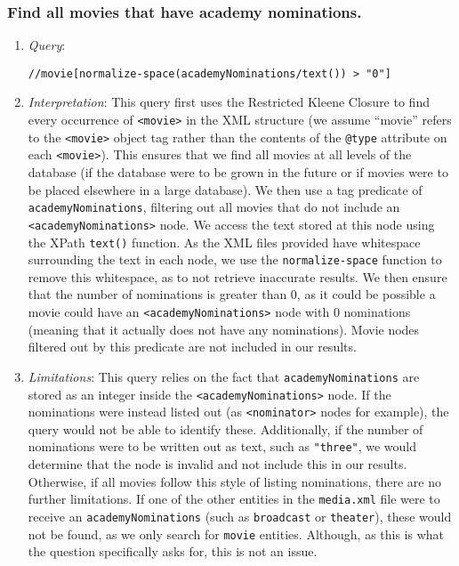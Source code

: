 \documentclass[11pt]{article}
\begin{document}
\subsubsection{Find all movies that have academy nominations.}

\begin{enumerate}
\item \textit{Query}:
\begin{small}
\begin{verbatim}
//movie[normalize-space(academyNominations/text()) > "0"]
\end{verbatim}
\end{small}
\item \textit{Interpretation}: This query first uses the Restricted Kleene Closure to find every occurrence of \texttt{<movie>} in the XML structure (we assume ``movie'' refers to the \texttt{<movie>} object tag rather than the contents of the \texttt{@type} attribute on each \texttt{<movie>}). This ensures that we find all movies at all levels of the database (if the database were to be grown in the future or if movies were to be placed elsewhere in a large database). We then use a tag predicate of \texttt{academyNominations}, filtering out all movies that do not include an \texttt{<academyNominations>} node. We access the text stored at this node using the XPath \texttt{text()} function. As the XML files provided have whitespace surrounding the text in each node, we use the \texttt{normalize-space} function to remove this whitespace, as to not retrieve inaccurate results. We then ensure that the number of nominations is greater than 0, as it could be possible a movie could have an \texttt{<academyNominations>} node with 0 nominations (meaning that it actually does not have any nominations). Movie nodes filtered out by this predicate are not included in our results.

\item \textit{Limitations}: This query relies on the fact that \texttt{academyNominations} are stored as an integer inside the \texttt{<academyNominations>} node. If the nominations were instead listed out (as \texttt{<nominator>} nodes for example), the query would not be able to identify these.
Additionally, if the number of nominations were to be written out as text, such as \texttt{"three"}, we would determine that the node is invalid and not include this in our results.
Otherwise, if all movies follow this style of listing nominations, there are no further limitations. If one of the other entities in the \texttt{media.xml} file were to receive an \texttt{academyNominations} (such as \texttt{broadcast} or \texttt{theater}), these would not be found, as we only search for \texttt{movie} entities. Although, as this is what the question specifically asks for, this is not an issue. 


\end{enumerate}
\end{document}
